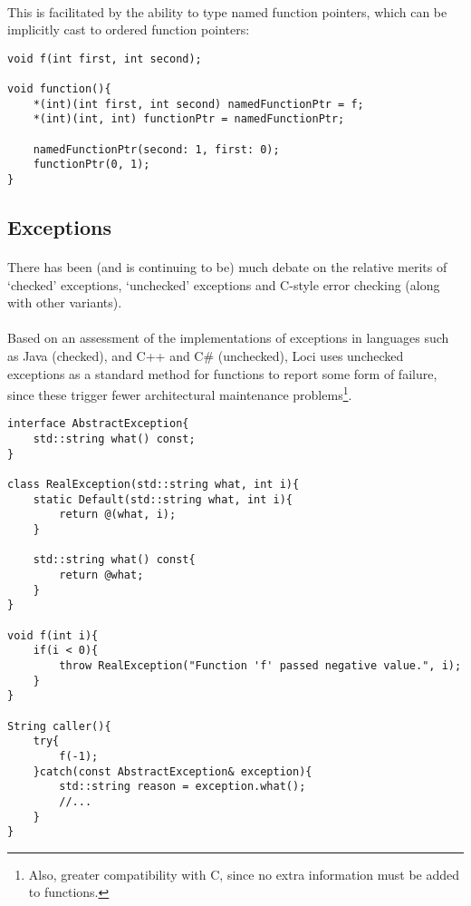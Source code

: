 \documentclass[12pt,twoside,notitlepage]{report}
\begin{document}
\paragraph{}
This is facilitated by the ability to type named function pointers, which can be implicitly cast to ordered function pointers:


\begin{lstlisting}
void f(int first, int second);

void function(){
	*(int)(int first, int second) namedFunctionPtr = f;
	*(int)(int, int) functionPtr = namedFunctionPtr;
	
	namedFunctionPtr(second: 1, first: 0);
	functionPtr(0, 1);
}
\end{lstlisting}


\clearpage

\subsection{Exceptions}

\paragraph{}
There has been (and is continuing to be) much debate on the relative merits of `checked' exceptions, `unchecked' exceptions and C-style error checking (along with other variants).

\paragraph{}
Based on an assessment of the implementations of exceptions in languages such as Java (checked), and C++ and C\# (unchecked), Loci uses unchecked exceptions as a standard method for functions to report some form of failure, since these trigger fewer architectural maintenance problems\footnote{Also, greater compatibility with C, since no extra information must be added to functions.}.


\begin{lstlisting}
interface AbstractException{
	std::string what() const;
}

class RealException(std::string what, int i){
	static Default(std::string what, int i){
		return @(what, i);
	}

	std::string what() const{
		return @what;
	}
}

void f(int i){
	if(i < 0){
		throw RealException("Function 'f' passed negative value.", i);
	}
}

String caller(){
	try{
		f(-1);
	}catch(const AbstractException& exception){
		std::string reason = exception.what();
		//...
	}
}
\end{lstlisting}
\end{document}
